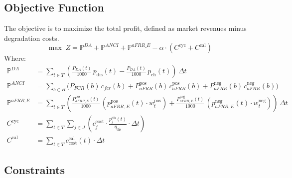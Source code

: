 \documentclass[11pt, a4paper]{article}
\begin{document}
\subsection{Objective Function}
The objective is to maximize the total profit, defined as market revenues minus degradation costs.
\begin{equation}
\max \; Z = \mathbb{P}^{DA} + \mathbb{P}^{ANCI} + \mathbb{P}^{aFRR\_E} - \alpha \cdot (C^{\mathrm{cyc}} + C^{\mathrm{cal}})
\end{equation}
Where:
\begin{align}
\mathbb{P}^{DA} &= \sum_{t\in T} \left( \frac{P_{DA}(t)}{1000}\, p_{\mathrm{dis}}(t) - \frac{P_{DA}(t)}{1000}\, p_{\mathrm{ch}}(t) \right)\, \Delta t \\
\mathbb{P}^{ANCI} &= \sum_{b\in B} \Big( P_{FCR}(b)\, c_{fcr}(b) + P^{\mathrm{pos}}_{aFRR}(b)\, c^{\mathrm{pos}}_{aFRR}(b) + P^{\mathrm{neg}}_{aFRR}(b)\, c^{\mathrm{neg}}_{aFRR}(b) \Big)\, \\
\mathbb{P}^{aFRR\_E} &= \sum_{t\in T} \left( \frac{P^{\mathrm{pos}}_{aFRR, E}(t)}{1000}\, (p^{\mathrm{pos}}_{aFRR, E}(t) \cdot w_t^{\mathrm{pos}}) + \frac{P^{\mathrm{neg}}_{aFRR, E}(t)}{1000}\, (p^{\mathrm{neg}}_{aFRR, E}(t) \cdot w_t^{\mathrm{neg}}) \right)\, \Delta t \\
C^{\mathrm{cyc}} &= \sum_{t \in T} \sum_{j \in J} \left( c^{\mathrm{cost}}_{j} \cdot \frac{p^{\mathrm{dis}}_{j}(t)}{\eta_{\mathrm{dis}}} \cdot \Delta t \right) \\
C^{\mathrm{cal}} &= \sum_{t \in T} c^{\mathrm{cal}}_{\mathrm{cost}}(t) \cdot \Delta t
\end{align}

\subsection{Constraints}
\end{document}
